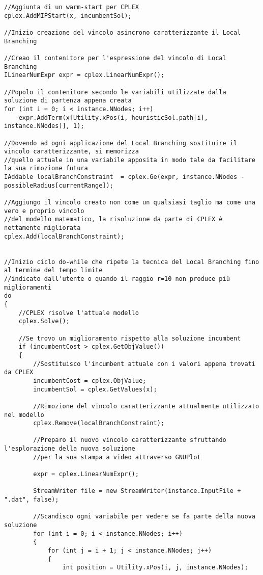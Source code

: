 \documentclass[11pt]{article}
\begin{document}
\begin{lstlisting}
//Aggiunta di un warm-start per CPLEX
cplex.AddMIPStart(x, incumbentSol);

//Inizio creazione del vincolo asincrono caratterizzante il Local Branching

//Creao il contenitore per l'espressione del vincolo di Local Branching
ILinearNumExpr expr = cplex.LinearNumExpr();

//Popolo il contenitore secondo le variabili utilizzate dalla soluzione di partenza appena creata
for (int i = 0; i < instance.NNodes; i++)
    expr.AddTerm(x[Utility.xPos(i, heuristicSol.path[i], instance.NNodes)], 1);

//Dovendo ad ogni applicazione del Local Branching sostituire il vincolo caratterizzante, si memorizza
//quello attuale in una variabile apposita in modo tale da facilitare la sua rimozione futura
IAddable localBranchConstraint  = cplex.Ge(expr, instance.NNodes - possibleRadius[currentRange]);

//Aggiungo il vincolo creato non come un qualsiasi taglio ma come una vero e proprio vincolo
//del modello matematico, la risoluzione da parte di CPLEX è nettamente migliorata
cplex.Add(localBranchConstraint);


//Inizio ciclo do-while che ripete la tecnica del Local Branching fino al termine del tempo limite
//indicato dall'utente o quando il raggio r=10 non produce più miglioramenti
do
{
    //CPLEX risolve l'attuale modello
    cplex.Solve();

    //Se trovo un miglioramento rispetto alla soluzione incumbent
    if (incumbentCost > cplex.GetObjValue())
    {
        //Sostituisco l'incumbent attuale con i valori appena trovati da CPLEX
        incumbentCost = cplex.ObjValue;
        incumbentSol = cplex.GetValues(x);

        //Rimozione del vincolo caratterizzante attualmente utilizzato nel modello
        cplex.Remove(localBranchConstraint);

        //Preparo il nuovo vincolo caratterizzante sfruttando l'esplorazione della nuova soluzione
        //per la sua stampa a video attraverso GNUPlot

        expr = cplex.LinearNumExpr();

        StreamWriter file = new StreamWriter(instance.InputFile + ".dat", false);

        //Scandisco ogni variabile per vedere se fa parte della nuova soluzione
        for (int i = 0; i < instance.NNodes; i++)
        {
            for (int j = i + 1; j < instance.NNodes; j++)
            {
                int position = Utility.xPos(i, j, instance.NNodes);


\end{lstlisting}
\end{document}
